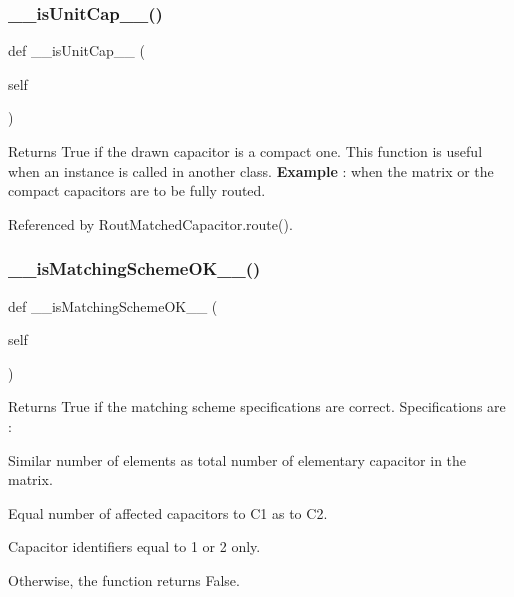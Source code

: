 \subsubsection{\texorpdfstring{\+\_\+\+\_\+is\+Unit\+Cap\+\_\+\+\_\+()}{\_\_isUnitCap\_\_()}}
{\footnotesize\ttfamily def \+\_\+\+\_\+is\+Unit\+Cap\+\_\+\+\_\+ (\begin{DoxyParamCaption}\item[{}]{self }\end{DoxyParamCaption})}

\begin{DoxyReturn}{Returns}
True if the drawn capacitor is a compact one. This function is useful when an instance is called in another class. {\bfseries Example} \+: when the matrix or the compact capacitors are to be fully routed. 
\end{DoxyReturn}


Referenced by Rout\+Matched\+Capacitor.\+route().

\mbox{\label{classpython_1_1capacitormatrix_1_1CapacitorStack_ada775cb99286f2386facfe173b74f8c6}} 
\subsubsection{\texorpdfstring{\+\_\+\+\_\+is\+Matching\+Scheme\+O\+K\+\_\+\+\_\+()}{\_\_isMatchingSchemeOK\_\_()}}
{\footnotesize\ttfamily def \+\_\+\+\_\+is\+Matching\+Scheme\+O\+K\+\_\+\+\_\+ (\begin{DoxyParamCaption}\item[{}]{self }\end{DoxyParamCaption})}

\begin{DoxyReturn}{Returns}
{\ttfamily True} if the matching scheme specifications are correct. Specifications are \+:
\begin{DoxyItemize}
\item Similar number of elements as total number of elementary capacitor in the matrix.
\item Equal number of affected capacitors to C1 as to C2.
\item Capacitor identifiers equal to \textquotesingle{}1\textquotesingle{} or \textquotesingle{}2\textquotesingle{} only.
\item Otherwise, the function returns {\ttfamily False}. 
\end{DoxyItemize}
\end{DoxyReturn}


